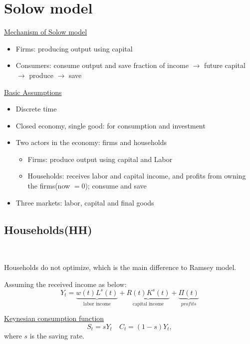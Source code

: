 \section{Solow model}

\underline{Mechanism of Solow model}

\begin{itemize}
    \item Firms: producing output using capital
    \item Consumers: consume output and save fraction of income $\rightarrow$ future capital $\rightarrow$ produce $\rightarrow$ save
\end{itemize}

\underline{Basic Assumptions}

\begin{itemize}
    \item Discrete time
    \item Closed economy, single good: for consumption and investment
    \item Two actors in the economy: firms and households
          \begin{itemize}
            \item Firms: produce output using capital and Labor
            \item Households: receives labor and capital income,
            and profits from owning the firms(now $=0$); consume and save
          \end{itemize}
    \item Three markets: labor, capital and final goods
\end{itemize}

\subsection{Households(HH)}

\begin{note}
    \ 

    Households do not optimize, which is the main difference to Ramsey model.
\end{note}

Assuming the received income as below:
\[
Y_t = \underset{\text{labor income}}{\underbrace{w(t) L^s(t)}} + \underset{\text{capital income}}{\underbrace{R(t) K^s(t)}} + \underset{profits}{\underbrace{\Pi (t)}}
\]

\underline{Keynesian consumption function}
\[S_t = sY_t \quad C_t = (1-s)Y_t,\]
where $s$ is the saving rate.

